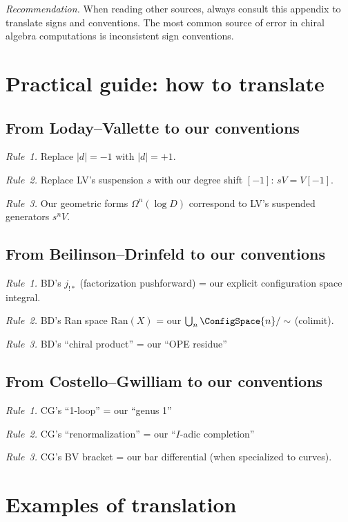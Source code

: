 \emph{Recommendation.} When reading other sources, always consult this appendix to translate signs and conventions. The most common source of error in chiral algebra computations is inconsistent sign conventions.

\section{Practical guide: how to translate}

\subsection{From Loday--Vallette to our conventions}

\emph{Rule~1.} Replace $|d| = -1$ with $|d| = +1$.

\emph{Rule~2.} Replace LV's suspension $s$ with our degree shift $[-1]$: $sV = V[-1]$.

\emph{Rule~3.} Our geometric forms $\Omega^n(\log D)$ correspond to LV's suspended generators $s^n V$.

\subsection{From Beilinson--Drinfeld to our conventions}

\emph{Rule~1.} BD's $j_{!*}$ (factorization pushforward) = our explicit configuration space integral.

\emph{Rule~2.} BD's Ran space $\text{Ran}(X)$ = our $\bigcup_n \ConfigSpace{n} / \sim$ (colimit).

\emph{Rule~3.} BD's ``chiral product'' = our ``OPE residue''

\subsection{From Costello--Gwilliam to our conventions}

\emph{Rule~1.} CG's ``1-loop'' = our ``genus 1''

\emph{Rule~2.} CG's ``renormalization'' = our ``$I$-adic completion''

\emph{Rule~3.} CG's BV bracket = our bar differential (when specialized to curves).

\section{Examples of translation}

